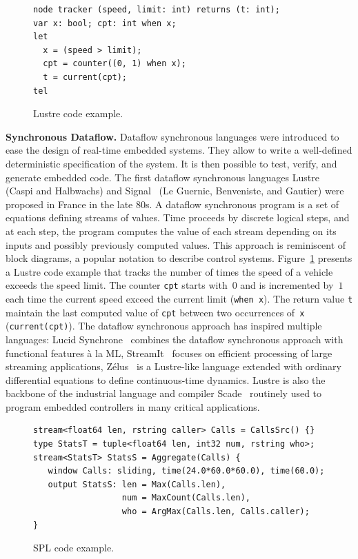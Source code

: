 \begin{figure}[!h]
\begin{lstlisting}
node tracker (speed, limit: int) returns (t: int);
var x: bool; cpt: int when x;
let
  x = (speed > limit);
  cpt = counter((0, 1) when x);
  t = current(cpt);
tel
\end{lstlisting}
\vspace*{-4mm}
\caption{\label{fig:lustre} Lustre code example.}
\end{figure}

\textbf{Synchronous Dataflow.}
Dataflow synchronous languages were introduced to ease the design of
real-time embedded systems. They allow to write a well-defined
deterministic specification of the system. It is then possible to
test, verify, and generate embedded code.
The first dataflow synchronous languages Lustre~\cite{lustre_1987}
(Caspi and Halbwachs) and Signal~\cite{signal_1991} (Le Guernic,
Benveniste, and Gautier) were proposed in France in the late 80s.
A dataflow synchronous program is a set of equations defining streams
of values. Time proceeds by discrete logical steps, and at each step,
the program computes the value of each stream depending on its inputs
and possibly previously computed values.
This approach is reminiscent of block diagrams, a popular notation to
describe control systems.
Figure~\ref{fig:lustre} presents a Lustre code example that tracks the
number of times the speed of a vehicle exceeds the speed limit. The
counter \lstinline{cpt} starts with~$0$ and is incremented by~$1$ each
time the current speed exceed the current limit (\lstinline{when x}).
The return value \lstinline{t} maintain the last computed value
of \lstinline{cpt} between two occurrences of~\lstinline{x}
(\lstinline{current(cpt)}).
The dataflow synchronous approach has inspired
multiple languages: Lucid Synchrone~\cite{lucid_2006} combines the
dataflow synchronous approach with functional features \`a la ML,
StreamIt~\cite{streamit_2002} focuses on efficient processing of large
streaming applications, Z\'elus~\cite{zelus_2013} is a Lustre-like
language extended with ordinary differential equations to define
continuous-time dynamics. Lustre is also the backbone of the
industrial language and compiler Scade~\cite{scade_2017} routinely
used to program embedded controllers in many critical applications.

\begin{figure}[!h]
\begin{lstlisting}
stream<float64 len, rstring caller> Calls = CallsSrc() {}
type StatsT = tuple<float64 len, int32 num, rstring who>;
stream<StatsT> StatsS = Aggregate(Calls) {
   window Calls: sliding, time(24.0*60.0*60.0), time(60.0);
   output StatsS: len = Max(Calls.len),
                  num = MaxCount(Calls.len),
                  who = ArgMax(Calls.len, Calls.caller);
}
\end{lstlisting}
\vspace*{-4mm}
\caption{\label{fig:spl}SPL code example.}
\end{figure}

